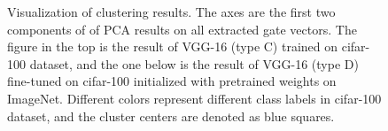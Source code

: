 \documentclass[sigplan,10pt,review]{acmart}\settopmatter{printfolios=true,printccs=false,printacmref=false}
\begin{document}
\begin{figure}[!htp]
	\centering
    \caption{Visualization of clustering results. The axes are the first two components of of PCA results on all extracted gate vectors. The figure in the top is the result of VGG-16 (type C) trained on cifar-100 dataset, and the one below is the result of VGG-16 (type D) fine-tuned on cifar-100 initialized with pretrained weights on ImageNet. Different colors represent different class labels in cifar-100 dataset, and the cluster centers are denoted as blue squares.}
    \label{fig:vgg-cluster-pca}
\end{figure}
\end{document}
